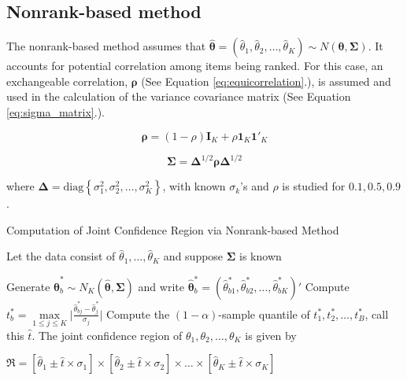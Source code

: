 \documentclass[
  12pt,
  a4paper,
]{article}
\numberwithin{equation}{section}
\begin{document}
\subsection{Nonrank-based method}\label{nonrank-based-method}

The nonrank-based method assumes that \(\boldsymbol{\hat\theta} = \left(\hat\theta_1, \hat\theta_2, \dots, \hat\theta_K\right) \sim N \left( \boldsymbol{\theta}, \boldsymbol{\Sigma}\right)\). It accounts for potential correlation among items being ranked. For this case, an exchangeable correlation, \(\boldsymbol{\rho}\) (See Equation \ref{eq:equicorrelation}.), is assumed and used in the calculation of the variance covariance matrix (See Equation \ref{eq:sigma_matrix}.).

\begin{equation}
  \boldsymbol{\rho} = \left( 1-\rho \right) \mathbf{I}_K + \rho \boldsymbol{1}_K \boldsymbol{1}'_K
  \label{eq:equicorrelation}
\end{equation}

\begin{equation}
  \boldsymbol{\Sigma} = \boldsymbol{\Delta}^{1/2} \boldsymbol{\rho} \boldsymbol{\Delta}^{1/2}
  \label{eq:sigma_matrix}
\end{equation}

where \(\boldsymbol{\Delta} = \text{diag} \left\{ \sigma^2_1, \sigma^2_2, \dots, \sigma^2_K \right\}\), with known \(\sigma_k\)'s and \(\rho\) is studied for \(0.1, 0.5, 0.9\).

\begin{algorithm}[H]
    \caption{Computation of Joint Confidence Region via Nonrank-based Method} 
    \label{alg:nonrank_ci}
    Let the data consist of $\hat \theta_1, \dots, \hat \theta_K$ and suppose $\boldsymbol{\Sigma}$ is known
    \begin{algorithmic}[1]
                \State Generate $\boldsymbol{\hat\theta}^*_b \sim N_K \left( \boldsymbol{\hat\theta}, \boldsymbol{\Sigma}\right)$ and write $\boldsymbol{\hat\theta}^*_b = \left( \hat\theta^*_{b1}, \hat\theta^*_{b2}, \dots, \hat\theta^*_{bK} \right)' $
                \State Compute $t^*_b = \underset{1 \leq j \leq K}{\max} \Bigg| \frac{\hat\theta^*_{bj} - \hat\theta^*_{j}}{\sigma_j} \Bigg|$
        \EndFor
        \State Compute the $\left(1-\alpha\right)$-sample quantile of $t^*_1, t^*_2, \dots, t^*_B$, call this $\hat{t}$.
        \State The joint confidence region of $\theta_1, \theta_2, \dots, \theta_K$ is given by 
        \Statex \begin{minipage}{\linewidth}
    \centering
$\mathfrak{R} = \left[ \hat\theta_1 \pm \hat t \times \sigma_1  \right] \times \left[ \hat\theta_2 \pm \hat t \times \sigma_2  \right] \times \dots \times \left[ \hat\theta_K \pm \hat t \times \sigma_K  \right]$
    \end{minipage}
    \end{algorithmic} 
\end{algorithm}
\end{document}
